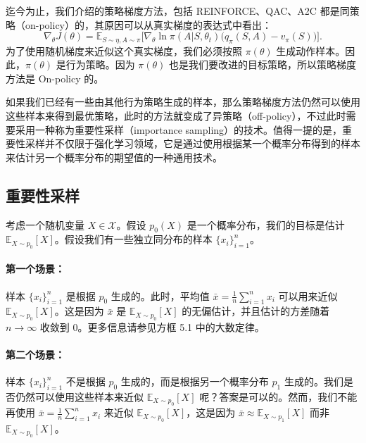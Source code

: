 迄今为止，我们介绍的策略梯度方法，包括 REINFORCE、QAC、A2C 都是同策略（on-policy）的，其原因可以从真实梯度的表达式中看出：
\[
\nabla_{\theta} J(\theta) = \mathbb{E}_{S \sim \eta, A \sim \pi} \Big[ \nabla_{\theta} \ln \pi(A | S, \theta_{t}) \big( q_{\pi}(S, A) - v_{\pi}(S) \big) \Big].
\]
为了使用随机梯度来近似这个真实梯度，我们必须按照 $\pi(\theta)$ 生成动作样本。因此，$\pi(\theta)$ 是行为策略。因为 $\pi(\theta)$ 也是我们要改进的目标策略，所以策略梯度方法是 On-policy 的。

如果我们已经有一些由其他行为策略生成的样本，那么策略梯度方法仍然可以使用这些样本来得到最优策略，此时的方法就变成了异策略（off-policy），不过此时需要采用一种称为重要性采样（importance sampling）的技术。值得一提的是，重要性采样并不仅限于强化学习领域，它是通过使用根据某一个概率分布得到的样本来估计另一个概率分布的期望值的一种通用技术。

\subsection{重要性采样}
\label{sec:rl-ac-is}

考虑一个随机变量 $X \in \mathcal{X}$。假设 $p_{0}(X)$ 是一个概率分布，我们的目标是估计 $\mathbb{E}_{X \sim p_{0}}[X]$。假设我们有一些独立同分布的样本 $\{x_{i}\}_{i=1}^{n}$。

\paragraph{第一个场景：}样本 $\{x_{i}\}_{i=1}^{n}$ 是根据 $p_{0}$ 生成的。此时，平均值 $\bar{x} = \frac{1}{n} \sum_{i=1}^{n} x_{i}$ 可以用来近似 $\mathbb{E}_{X \sim p_{0}}[X]$。这是因为 $\bar{x}$ 是 $\mathbb{E}_{X \sim p_{0}}[X]$ 的无偏估计，并且估计的方差随着 $n \to \infty$ 收敛到 0。更多信息请参见方框 5.1 中的大数定律。

\paragraph{第二个场景：}样本 $\{x_{i}\}_{i=1}^{n}$ 不是根据 $p_{0}$ 生成的，而是根据另一个概率分布 $p_{1}$ 生成的。我们是否仍然可以使用这些样本来近似 $\mathbb{E}_{X \sim p_{0}}[X]$ 呢？答案是可以的。然而，我们不能再使用 $\bar{x} = \frac{1}{n} \sum_{i=1}^{n} x_{i}$ 来近似 $\mathbb{E}_{X \sim p_{0}}[X]$，这是因为 $\bar{x} \approx \mathbb{E}_{X \sim p_{1}}[X]$ 而非 $\mathbb{E}_{X \sim p_{0}}[X]$。

